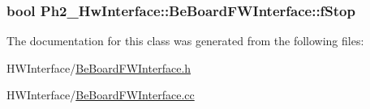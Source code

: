 \hypertarget{class_ph2___hw_interface_1_1_be_board_f_w_interface_a2eae0dd93411d8acec67a41bcc09339b}{
\subsubsection[{f\-Stop}]{\setlength{\rightskip}{0pt plus 5cm}bool Ph2\-\_\-\-Hw\-Interface\-::\-Be\-Board\-F\-W\-Interface\-::f\-Stop}}\label{class_ph2___hw_interface_1_1_be_board_f_w_interface_a2eae0dd93411d8acec67a41bcc09339b}


The documentation for this class was generated from the following files\-:\begin{DoxyCompactItemize}
\item 
H\-W\-Interface/\hyperlink{_be_board_f_w_interface_8h}{Be\-Board\-F\-W\-Interface.\-h}\item 
H\-W\-Interface/\hyperlink{_be_board_f_w_interface_8cc}{Be\-Board\-F\-W\-Interface.\-cc}\end{DoxyCompactItemize}
